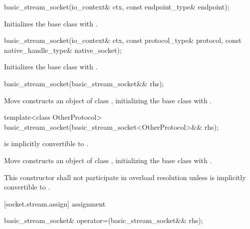 \begin{itemdecl}
basic_stream_socket(io_context& ctx, const endpoint_type& endpoint);
\end{itemdecl}

\begin{itemdescr}
\pnum
\effects Initializes the base class with .
\end{itemdescr}

\begin{itemdecl}
basic_stream_socket(io_context& ctx, const protocol_type& protocol,
                      const native_handle_type& native_socket);
\end{itemdecl}

\begin{itemdescr}
\pnum
\effects Initializes the base class with .
\end{itemdescr}

\begin{itemdecl}
basic_stream_socket(basic_stream_socket&& rhs);
\end{itemdecl}

\begin{itemdescr}
\pnum
\effects Move constructs an object of class , initializing the base class with .
\end{itemdescr}

\begin{itemdecl}
template<class OtherProtocol>
  basic_stream_socket(basic_stream_socket<OtherProtocol>&& rhs);
\end{itemdecl}

\begin{itemdescr}
\pnum
\requires {} is implicitly convertible to .

\pnum
\effects Move constructs an object of class , initializing the base class with .

\pnum
\remarks This constructor shall not participate in overload resolution unless  is implicitly convertible to .
\end{itemdescr}



[socket.stream.assign]{ assignment}

\begin{itemdecl}
basic_stream_socket& operator=(basic_stream_socket&& rhs);
\end{itemdecl}

